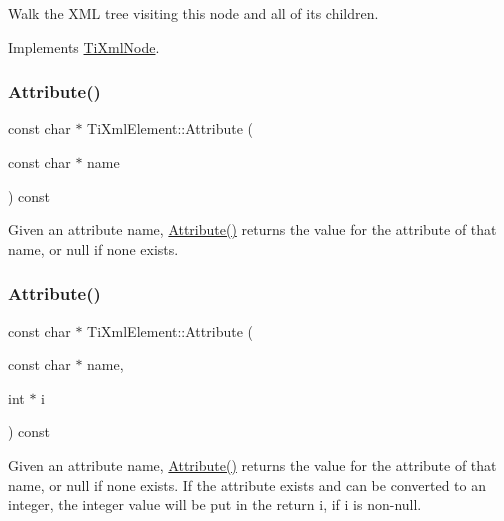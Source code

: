 Walk the X\+ML tree visiting this node and all of its children. 

Implements \hyperlink{class_ti_xml_node_acc0f88b7462c6cb73809d410a4f5bb86}{Ti\+Xml\+Node}.

\hypertarget{class_ti_xml_element_a6042f518748f475a7ac4b4e0b509eb05}{}\label{class_ti_xml_element_a6042f518748f475a7ac4b4e0b509eb05} 
\subsubsection{\texorpdfstring{Attribute()}{Attribute()}\hspace{0.1cm}{\footnotesize\ttfamily [1/3]}}
{\footnotesize\ttfamily const char $\ast$ Ti\+Xml\+Element\+::\+Attribute (\begin{DoxyParamCaption}\item[{const char $\ast$}]{name }\end{DoxyParamCaption}) const}

Given an attribute name, \hyperlink{class_ti_xml_element_a6042f518748f475a7ac4b4e0b509eb05}{Attribute()} returns the value for the attribute of that name, or null if none exists. \hypertarget{class_ti_xml_element_a8005d0b808fd02bd1246710cdf95e5f6}{}\label{class_ti_xml_element_a8005d0b808fd02bd1246710cdf95e5f6} 
\subsubsection{\texorpdfstring{Attribute()}{Attribute()}\hspace{0.1cm}{\footnotesize\ttfamily [2/3]}}
{\footnotesize\ttfamily const char $\ast$ Ti\+Xml\+Element\+::\+Attribute (\begin{DoxyParamCaption}\item[{const char $\ast$}]{name,  }\item[{int $\ast$}]{i }\end{DoxyParamCaption}) const}

Given an attribute name, \hyperlink{class_ti_xml_element_a6042f518748f475a7ac4b4e0b509eb05}{Attribute()} returns the value for the attribute of that name, or null if none exists. If the attribute exists and can be converted to an integer, the integer value will be put in the return \textquotesingle{}i\textquotesingle{}, if \textquotesingle{}i\textquotesingle{} is non-\/null. \hypertarget{class_ti_xml_element_a09df893402d0ab1402c8725e6d30ec04}{}\label{class_ti_xml_element_a09df893402d0ab1402c8725e6d30ec04} 
